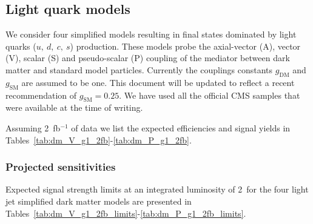 \subsection{Light quark models}
\label{sec:dm_lightjet}

We consider four simplified models resulting in final states dominated by light quarks ($u,~d,~c,~s$) production. These
models probe the axial-vector (A), vector (V), scalar (S) and pseudo-scalar (P) coupling of the mediator between dark
matter and standard model particles. Currently the couplings constants $g_\textrm{DM}$ and $g_\textrm{SM}$ are assumed
to be one. This document will be updated to reflect a recent recommendation of $g_\textrm{SM}=0.25$. We have used all
the official CMS samples that were available at the time of writing.

Assuming 2~fb$^{-1}$ of data we list the expected efficiencies and signal yields in
Tables~\ref{tab:dm_V_g1_2fb}-\ref{tab:dm_P_g1_2fb}. 

\newpage

\newpage

\newpage

\newpage

\newpage


\subsubsection{Projected sensitivities}

Expected signal strength limits at an integrated luminosity of 2~\ifb for the four light jet simplified dark matter models
are presented in Tables~\ref{tab:dm_V_g1_2fb_limits}-\ref{tab:dm_P_g1_2fb_limits}.



\newpage









